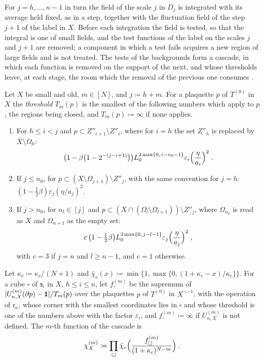 \documentclass[11pt]{preprint}
\newcommand{\id}{\mathbf 1}
\DeclarePairedDelimiter{\abs}{\lvert}{\rvert}
\numberwithin{equation}{section}
\begin{document}
For $j = h, \dots, n - 1$ in turn the field of the scale $j$ in $D_j$ is integrated with its average held fixed, as in a step, together with the fluctuation field of the step $j + 1$ of the label in $X$. Before each integration the field is tested, so that the integral is one of small fields, and the test functions of the label on the scales $j$ and $j + 1$ are removed; a component in which a test fails acquires a new region of large fields and is not treated. The tests of the backgrounds form a cascade, in which each function is removed on the support of the next, and whose thresholds leave, at each stage, the room which the removal of the previous one consumes \cite[(1.22)--(1.24), pp.~181--182]{BalabanLFR1}.

\begin{definition}\label{def:cascade}
Let $X$ be small and old, $m \in [N]$, and $j \coloneqq h + m$. For a plaquette $p$ of $T^{(0)}$ in $X$ the \emph{threshold} $T_m(p)$ is the smallest of the following numbers which apply to $p$, the regions being closed, and $T_m(p) \coloneqq \infty$ if none applies.
\begin{enumerate}[label=(\roman*)]
\item For $h \leqslant i < j$ and $p \subset Z''_{i+1} \setminus Z''_i$, where for $i = h$ the set $Z''_h$ is replaced by $X \setminus \Omega_h$:
\[
    \bigl(1 - \beta\bigl(1 - 2^{-(j-i+1)}\bigr)\bigr)L_0^{2\max\{0,\, i-n_0-1\}}\varepsilon_i\Bigl(\frac{\eta}{a_i}\Bigr)^2\;.
\]
\item If $j \leqslant n_0$, for $p \subset (X \setminus \Omega_{j+1}) \setminus Z''_j$, with the same convention for $j = h$: $(1 - \frac{1}{2}\beta)\varepsilon_j(\eta/a_j)^2$.
\item If $j > n_0$, for $n_l \in [j]$ and $p \subset (X \cap (\Omega_l \setminus \Omega_{l+1})) \setminus Z''_j$, where $\Omega_{n_0}$ is read as $X$ and $\Omega_{n+1}$ as the empty set:
\[
    c\,\bigl(1 - \tfrac{1}{2}\beta\bigr)L_0^{2\max\{0,\, j-l-1\}}\varepsilon_j\Bigl(\frac{\eta}{a_j}\Bigr)^2\;,
\]
with $c = 3$ if $j = n$ and $l \geqslant n - 1$, and $c = 1$ otherwise.
\end{enumerate}
Let $\kappa_c \coloneqq \kappa_s/(N + 1)$ and $\bar\chi_c(x) \coloneqq \min\{ 1, \max\{ 0, (1 + \kappa_c - x)/\kappa_c \} \}$. For a cube $\square$ of $\mathsf s_i$ in $X$, $h \leqslant i \leqslant n$, let $f^{(m)}_\square$ be the supremum of $\abs{U^{(m)}_{n,X}(\partial p) - \id}/T_m(p)$ over the plaquettes $p$ of $T^{(0)}$ in $X^{\sim-1}$, with the operation of $\mathsf r_n$, whose corner with the smallest coordinates lies in $\square$ and whose threshold is one of the numbers above with the factor $\varepsilon_i$, and $f^{(m)}_\square \coloneqq \infty$ if $U^{(m)}_{n,X}$ is not defined. The $m$-th function of the cascade is
\begin{equation}\label{eq:cascade}
    \chi^{(m)}_X \coloneqq \prod_\square\bar\chi_c\Bigl(\frac{f^{(m)}_\square}{(1 + \kappa_c)^{N-m}}\Bigr)\;.
\end{equation}
\end{definition}
\end{document}
